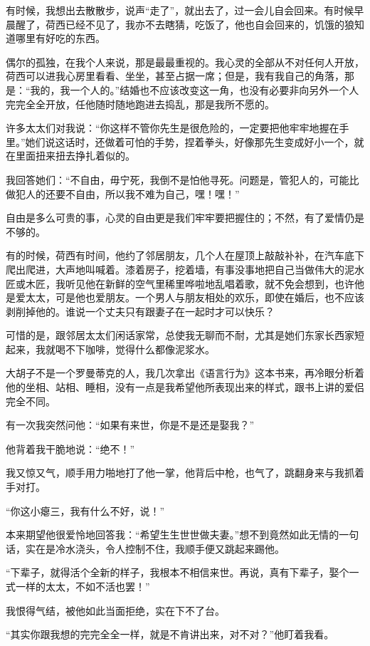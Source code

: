 \par 有时候，我想出去散散步，说声“走了”，就出去了，过一会儿自会回来。有时候早晨醒了，荷西已经不见了，我亦不去瞎猜，吃饭了，他也自会回来的，饥饿的狼知道哪里有好吃的东西。
\par 偶尔的孤独，在我个人来说，那是最最重视的。我心灵的全部从不对任何人开放，荷西可以进我心房里看看、坐坐，甚至占据一席；但是，我有我自己的角落，那是：“我的，我一个人的。”结婚也不应该改变这一角，也没有必要非向另外一个人完完全全开放，任他随时随地跑进去捣乱，那是我所不愿的。
\par 许多太太们对我说：“你这样不管你先生是很危险的，一定要把他牢牢地握在手里。”她们说这话时，还做着可怕的手势，捏着拳头，好像那先生变成好小一个，就在里面扭来扭去挣扎着似的。
\par 我回答她们：“不自由，毋宁死，我倒不是怕他寻死。问题是，管犯人的，可能比做犯人的还要不自由，所以我不难为自己，嘿！嘿！”
\par 自由是多么可贵的事，心灵的自由更是我们牢牢要把握住的；不然，有了爱情仍是不够的。
\par 有的时候，荷西有时间，他约了邻居朋友，几个人在屋顶上敲敲补补，在汽车底下爬出爬进，大声地叫喊着。漆着房子，挖着墙，有事没事地把自己当做伟大的泥水匠或木匠，我听见他在新鲜的空气里稀里哗啦地乱唱着歌，就不免会想到，也许他是爱太太，可是他也爱朋友。一个男人与朋友相处的欢乐，即使在婚后，也不应该剥削掉他的。谁说一个丈夫只有跟妻子在一起时才可以快乐？
\par 可惜的是，跟邻居太太们闲话家常，总使我无聊而不耐，尤其是她们东家长西家短起来，我就喝不下咖啡，觉得什么都像泥浆水。
\par 大胡子不是一个罗曼蒂克的人，我几次拿出《语言行为》这本书来，再冷眼分析着他的坐相、站相、睡相，没有一点是我希望他所表现出来的样式，跟书上讲的爱侣完全不同。
\par 有一次我突然问他：“如果有来世，你是不是还是娶我？”
\par 他背着我干脆地说：“绝不！”
\par 我又惊又气，顺手用力啪地打了他一掌，他背后中枪，也气了，跳翻身来与我抓着手对打。
\par “你这小瘪三，我有什么不好，说！”
\par 本来期望他很爱怜地回答我：“希望生生世世做夫妻。”想不到竟然如此无情的一句话，实在是冷水浇头，令人控制不住，我顺手便又跳起来踢他。
\par “下辈子，就得活个全新的样子，我根本不相信来世。再说，真有下辈子，娶个一式一样的太太，不如不活也罢！”
\par 我恨得气结，被他如此当面拒绝，实在下不了台。
\par “其实你跟我想的完完全全一样，就是不肯讲出来，对不对？”他盯着我看。
